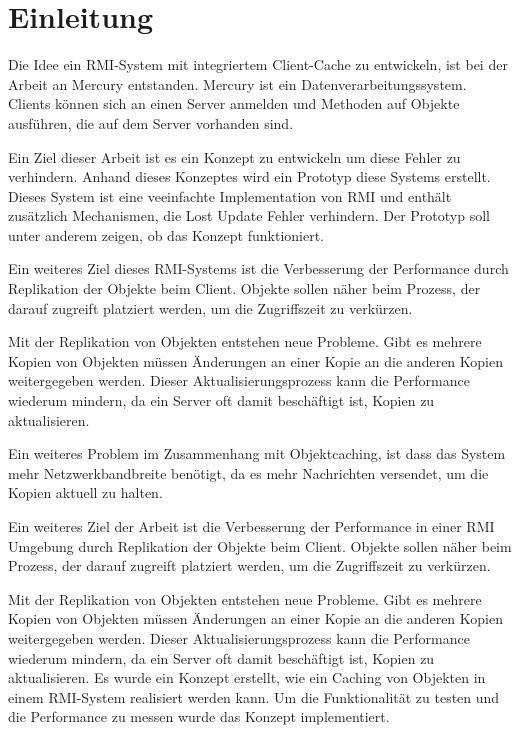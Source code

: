 \chapter{Einleitung}

Die Idee ein RMI-System mit integriertem Client-Cache zu entwickeln, ist bei der Arbeit an Mercury entstanden. Mercury ist ein Datenverarbeitungssystem. Clients können sich an einen Server anmelden und Methoden auf Objekte ausführen, die auf dem Server vorhanden sind. 

Ein Ziel dieser Arbeit ist es ein Konzept zu entwickeln um
diese Fehler zu verhindern. Anhand dieses Konzeptes wird ein Prototyp
diese Systems erstellt. Dieses System ist eine veeinfachte
Implementation von RMI und enthält zusätzlich Mechanismen, die Lost
Update Fehler verhindern. Der Prototyp soll unter anderem zeigen, ob
das Konzept funktioniert. 

Ein weiteres Ziel dieses RMI-Systems ist die Verbesserung der Performance durch Replikation der Objekte beim Client. Objekte sollen näher beim Prozess, der darauf zugreift platziert werden, um die Zugriffszeit zu verkürzen.

Mit der Replikation von Objekten entstehen neue Probleme. Gibt es mehrere Kopien von Objekten müssen Änderungen an einer Kopie an die anderen Kopien weitergegeben werden. Dieser Aktualisierungsprozess kann die Performance wiederum mindern, da ein Server oft damit beschäftigt ist, Kopien zu aktualisieren.

Ein weiteres Problem im Zusammenhang mit Objektcaching, ist dass das System mehr Netzwerkbandbreite benötigt, da es mehr Nachrichten versendet, um die Kopien aktuell zu halten.

Ein weiteres Ziel der Arbeit ist die Verbesserung der Performance in einer RMI Umgebung durch Replikation der Objekte beim Client. Objekte sollen näher beim Prozess, der darauf zugreift platziert werden, um die Zugriffszeit zu verkürzen.

Mit der Replikation von Objekten entstehen neue Probleme. Gibt es mehrere Kopien von Objekten müssen Änderungen an einer Kopie an die anderen Kopien weitergegeben werden. Dieser Aktualisierungsprozess kann die Performance wiederum mindern, da ein Server oft damit beschäftigt ist, Kopien zu aktualisieren. Es wurde ein Konzept erstellt, wie ein Caching von Objekten in einem RMI-System realisiert werden kann. Um die Funktionalität zu testen und die Performance zu messen wurde das Konzept implementiert. 

